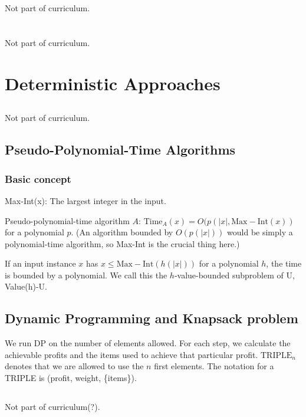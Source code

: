 \documentclass{book}
\newcommand{\maxint}[1]{\ensuremath{\mathrm{Max-Int}(#1)}}
\begin{document}
\chapter{}
Not part of curriculum.

\chapter{}
Not part of curriculum.

\chapter{Deterministic Approaches}
\section{}
Not part of curriculum.
\section{Pseudo-Polynomial-Time Algorithms}
\subsection{Basic concept}
Max-Int(x): The largest integer in the input.

Pseudo-polynomial-time algorithm $A$:
$\mathrm{Time}_A(x) = O(p(|x|, \maxint{x})$ for a polynomial $p$. (An algorithm bounded by $O(p(|x|))$ would be simply a polynomial-time algorithm, so Max-Int is the crucial thing here.)

If an input instance $x$ has $x \leq \maxint{h(|x|)}$ for a polynomial $h$, the time is bounded by a polynomial. We call this the $h$-value-bounded subproblem of U, Value(h)-U.

\section{Dynamic Programming and Knapsack problem}
We run DP on the number of elements allowed. For each step, we calculate the achievable profits and the items used to achieve that particular profit. $\mathrm{TRIPLE}_n$ denotes that we are allowed to use the $n$ first elements. The notation for a TRIPLE is (profit, weight, \{items\}).

\section{}
Not part of curriculum(?).
\end{document}
